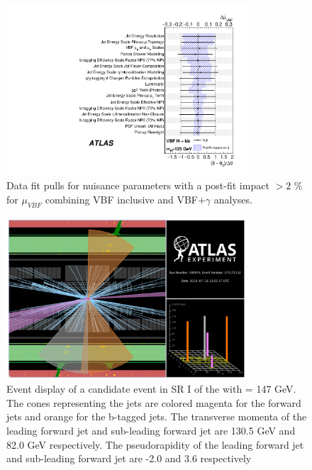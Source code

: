 \begin{figure}[htbp]
  \centering
 \includegraphics[width=0.8\textwidth]{figures/VBF/VBFHbb_Combined_vbfonly_pulls_125.pdf}
\caption{Data fit pulls for nuisance parameters with a post-fit impact $> 2$ \% for $\mu_{VBF}$ combining VBF inclusive and VBF$+\gamma$ analyses.}
  \label{fig:vbf-vbffitpull_combination}
\end{figure}


\begin{figure}[htbp]
  \centering
 \includegraphics[width=0.8\textwidth]{figures/VBF/EvtDisplay2cen}
\caption{Event display of a \twocentral candidate event in SR I of the with \Mbb = 147 GeV. The cones representing the jets are colored magenta for the forward jets and orange for the b-tagged jets. The transverse momenta of the leading forward jet and sub-leading forward jet are 130.5 GeV and 82.0 GeV respectively. The pseudorapidity of the leading forward jet and sub-leading forward jet are -2.0 and 3.6 respectively}
  \label{fig:vbf-evtdisplay}
\end{figure}


